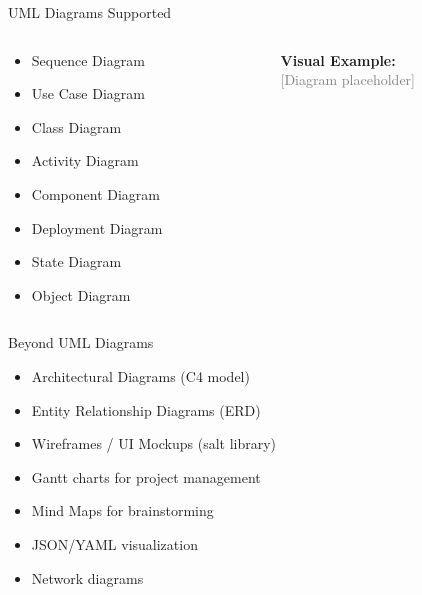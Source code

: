 \documentclass{beamer}
\begin{document}
\begin{frame}{UML Diagrams Supported}
    \begin{columns}
    \begin{column}{0.5\textwidth}
        \begin{itemize}
            \item Sequence Diagram
            \item Use Case Diagram
            \item Class Diagram
            \item Activity Diagram
            \item Component Diagram
            \item Deployment Diagram
            \item State Diagram
            \item Object Diagram
        \end{itemize}
    \end{column}
    \begin{column}{0.5\textwidth}
        \centering
        \textbf{Visual Example:}\\
        \textcolor{gray}{\scriptsize[Diagram placeholder]}
        \vspace{2cm}
    \end{column}
    \end{columns}
\end{frame}

\begin{frame}{Beyond UML Diagrams}
    \begin{itemize}
        \item Architectural Diagrams (C4 model)
        \item Entity Relationship Diagrams (ERD)
        \item Wireframes / UI Mockups (salt library)
        \item Gantt charts for project management
        \item Mind Maps for brainstorming
        \item JSON/YAML visualization
        \item Network diagrams
    \end{itemize}
\end{frame}
\end{document}
